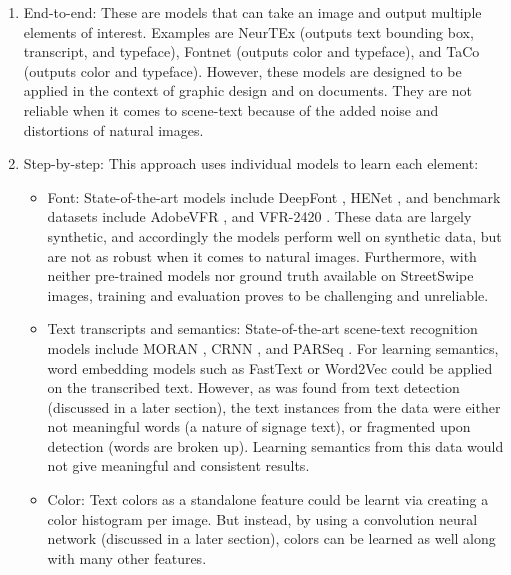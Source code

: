 \begin{enumerate}
    \item End-to-end: These are models that can take an image and output multiple elements of interest. Examples are NeurTEx \cite{aggarwal_neurtex_2022} (outputs text bounding box, transcript, and typeface), Fontnet \cite{s_fontnet_2021} (outputs color and typeface), and TaCo \cite{nie_taco_2022} (outputs color and typeface). However, these models are designed to be applied in the context of graphic design and on documents. They are not reliable when it comes to scene-text because of the added noise and distortions of natural images.
    \item Step-by-step: This approach uses individual models to learn each element:
    \begin{itemize}
        \item Font: State-of-the-art models include DeepFont \cite{wang_deepfont_2015}, HENet \cite{chen_henet_2021}, and benchmark datasets include AdobeVFR \cite{wang_deepfont_2015}, and VFR-2420 \cite{chen_large-scale_2014}. These data are largely synthetic, and accordingly the models perform well on synthetic data, but are not as robust when it comes to natural images. Furthermore, with neither pre-trained models nor ground truth available on StreetSwipe images, training and evaluation proves to be challenging and unreliable.
        \item Text transcripts and semantics: State-of-the-art scene-text recognition models include MORAN \cite{luo_multi-object_2019}, CRNN \cite{shi_end2end_2015}, and PARSeq \cite{bautista_scene_2022}. For learning semantics, word embedding models such as FastText \cite{bojanowski_enriching_2017} or Word2Vec \cite{mikolov_efficient_2013} could be applied on the transcribed text. However, as was found from text detection (discussed in a later section), the text instances from the data were either not meaningful words (a nature of signage text), or fragmented upon detection (words are broken up). Learning semantics from this data would not give meaningful and consistent results.
        \item Color: Text colors as a standalone feature could be learnt via creating a color histogram \cite{srivastava_review_2015} per image. But instead, by using a convolution neural network (discussed in a later section), colors can be learned as well along with many other features.
    \end{itemize}
\end{enumerate}

